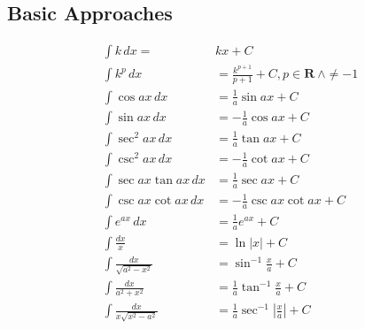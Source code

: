 \subsection{Basic Approaches}

\begin{align}
\int k\, dx = & kx + C \\
\int k^p\, dx &= \frac{k^{p+1}}{p + 1} + C, p \in \mathbf{R} \ \wedge \neq -1 \\
\int \cos ax \, dx &= \frac{1}{a} \sin ax + C \\
\int \sin ax \, dx &= - \frac{1}{a} \cos ax + C \\
\int \sec^2 ax \, dx &= \frac{1}{a} \tan ax + C \\
\int \csc^2 ax \, dx &= - \frac{1}{a} \cot ax + C \\
\int \sec ax \tan ax \, dx &= \frac{1}{a} \sec ax + C \\
\int \csc ax \cot ax \, dx &= - \frac{1}{a} \csc ax \cot ax + C \\
\int e^{ax}\, dx &= \frac{1}{a} e^{ax} + C \\
\int \frac{dx}{x} &= \ln \left| x \right| + C \\
\int \frac{dx}{\sqrt{a^2 - x^2}} &= \sin^{-1} \frac{x}{a} + C \\
\int \frac{dx}{a^2 + x^2} &= \frac{1}{a} \tan^{-1} \frac{x}{a} + C \\
\int  \frac{dx}{x\sqrt{x^2 - a^2}} &= \frac{1}{a} \sec^{-1} \left| \frac{x}{a} \right| + C
\end{align}
